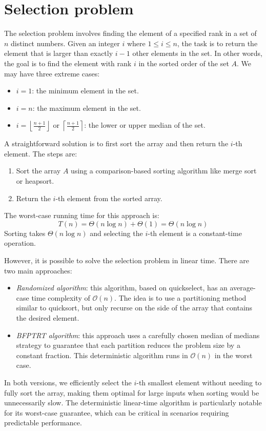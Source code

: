 \section{Selection problem}

The selection problem involves finding the element of a specified rank in a set of  $n$ distinct numbers. 
Given an integer $i$ where $1\leq i \leq n$, the task is to return the element that is larger than exactly $i-1$ other elements in the set.
In other words, the goal is to find the element with rank $i$ in the sorted order of the set $A$.
We may have three extreme cases: 
\begin{itemize}
    \item $i=1$: the minimum element in the set. 
    \item $i=n$: the maximum element in the set. 
    \item $i=\left\lfloor \frac{n+1}{2}\right\rfloor$ or $\left\lceil \frac{n+1}{2}\right\rceil$: the lower or upper median of the set.
\end{itemize}

A straightforward solution is to first sort the array and then return the $i$-th element.
The steps are:
\begin{enumerate}
    \item Sort the array $A$ using a comparison-based sorting algorithm like merge sort or heapsort.
    \item Return the $i$-th element from the sorted array.
\end{enumerate}
The worst-case running time for this approach is:
\[T(n)=\Theta(n\log n)+\Theta(1)=\Theta(n\log n)\]
Sorting takes $\Theta(n\log n)$ and selecting the $i$-th element is a constant-time operation.

However, it is possible to solve the selection problem in linear time. 
There are two main approaches:
\begin{itemize}
    \item \textit{Randomized algorithm}: this algorithm, based on quickselect, has an average-case time complexity of $\mathcal{O}(n)$. 
        The idea is to use a partitioning method similar to quicksort, but only recurse on the side of the array that contains the desired element.
    \item \textit{BFPTRT algorithm}: this approach uses a carefully chosen median of medians strategy to guarantee that each partition reduces the problem size by a constant fraction. 
        This deterministic algorithm runs in $\mathcal{O}(n)$ in the worst case.
\end{itemize}
In both versions, we efficiently select the $i$-th smallest element without needing to fully sort the array, making them optimal for large inputs when sorting would be unnecessarily slow.
The deterministic linear-time algorithm is particularly notable for its worst-case guarantee, which can be critical in scenarios requiring predictable performance.

